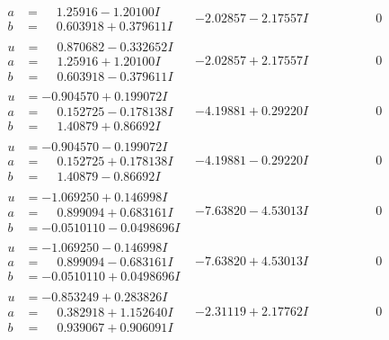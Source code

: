 \documentclass[1p]{elsarticle_modified}
\theoremstyle{definition}
\begin{document}
$$\begin{array}{c|c|c}
\begin{aligned}
a &= \phantom{-}1.25916 - 1.20100 I \\
b &= \phantom{-}0.603918 + 0.379611 I\end{aligned}
 & -2.02857 - 2.17557 I & \phantom{-0.000000 } 0 \\ \hline\begin{aligned}
u &= \phantom{-}0.870682 - 0.332652 I \\
a &= \phantom{-}1.25916 + 1.20100 I \\
b &= \phantom{-}0.603918 - 0.379611 I\end{aligned}
 & -2.02857 + 2.17557 I & \phantom{-0.000000 } 0 \\ \hline\begin{aligned}
u &= -0.904570 + 0.199072 I \\
a &= \phantom{-}0.152725 - 0.178138 I \\
b &= \phantom{-}1.40879 + 0.86692 I\end{aligned}
 & -4.19881 + 0.29220 I & \phantom{-0.000000 } 0 \\ \hline\begin{aligned}
u &= -0.904570 - 0.199072 I \\
a &= \phantom{-}0.152725 + 0.178138 I \\
b &= \phantom{-}1.40879 - 0.86692 I\end{aligned}
 & -4.19881 - 0.29220 I & \phantom{-0.000000 } 0 \\ \hline\begin{aligned}
u &= -1.069250 + 0.146998 I \\
a &= \phantom{-}0.899094 + 0.683161 I \\
b &= -0.0510110 - 0.0498696 I\end{aligned}
 & -7.63820 - 4.53013 I & \phantom{-0.000000 } 0 \\ \hline\begin{aligned}
u &= -1.069250 - 0.146998 I \\
a &= \phantom{-}0.899094 - 0.683161 I \\
b &= -0.0510110 + 0.0498696 I\end{aligned}
 & -7.63820 + 4.53013 I & \phantom{-0.000000 } 0 \\ \hline\begin{aligned}
u &= -0.853249 + 0.283826 I \\
a &= \phantom{-}0.382918 + 1.152640 I \\
b &= \phantom{-}0.939067 + 0.906091 I\end{aligned}
 & -2.31119 + 2.17762 I & \phantom{-0.000000 } 0 \\ \hline\begin{aligned}

\end{aligned}
\end{array}$$
\end{document}
